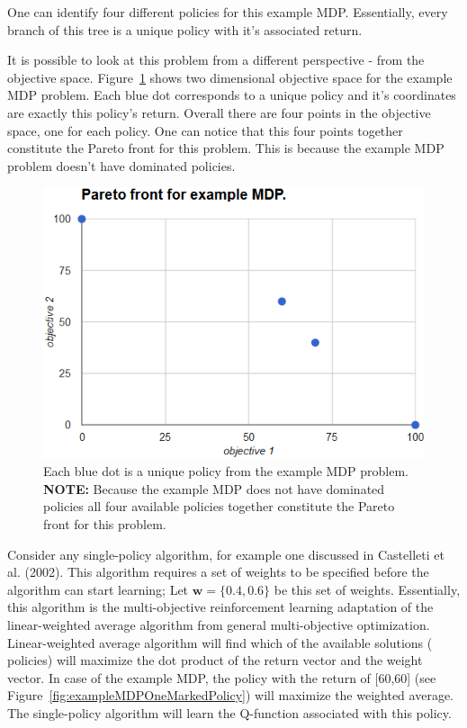One can identify four different policies for this example MDP. Essentially, every branch of this tree is a unique policy with it's associated return.

It is possible to look at this problem from a different perspective - from the objective space. Figure~\ref{fig:exampleMDPFront} shows two dimensional objective space for the example MDP problem. Each blue dot corresponds to a unique policy and it's coordinates are exactly this policy's return. Overall there are four points in the objective space, one for each policy. One can notice that this four points together constitute the Pareto front for this problem. This is because the example MDP problem doesn't have dominated policies.\\

\begin{figure}[ht]
\centering
\includegraphics[scale=0.6]{exampleMDPFront.png}
\caption{Each blue dot is a unique policy from the example MDP problem. \textbf{NOTE:} Because the example MDP does not have dominated policies all four available policies together constitute the Pareto front for this problem.}
\label{fig:exampleMDPFront}
\end{figure}

Consider any single-policy algorithm, for example one discussed in Castelleti et al. (2002)\nocite{castelletti2002reinforcement}. This algorithm requires a set of weights to be specified before the algorithm can start learning; Let $ \textbf{w} = \{0.4,0.6\} $ be this set of weights. Essentially, this algorithm is the multi-objective reinforcement learning adaptation of the linear-weighted average algorithm from general multi-objective optimization. Linear-weighted average algorithm will find which of the available solutions ( policies) will maximize the dot product of the return vector and the weight vector. In case of the example MDP, the policy with the return of [60,60] (see Figure~\ref{fig:exampleMDPOneMarkedPolicy}) will maximize the weighted average. The single-policy algorithm will learn the Q-function associated with this policy.


